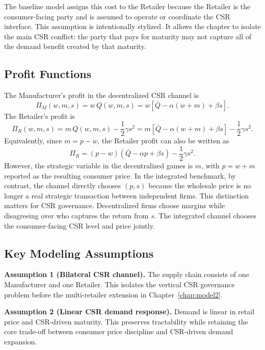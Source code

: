 The baseline model assigns this cost to the Retailer because the Retailer is the consumer-facing party and is assumed to operate or coordinate the CSR interface. This assumption is intentionally stylized. It allows the chapter to isolate the main CSR conflict: the party that pays for maturity may not capture all of the demand benefit created by that maturity.

\subsection{Profit Functions}

The Manufacturer's profit in the decentralized CSR channel is
\begin{equation}
    \Pi_M(w,m,s)=w\,Q(w,m,s)=w\left[\bar{Q}-\alpha(w+m)+\beta s\right].
    \label{eq:pi_M_markup}
\end{equation}
The Retailer's profit is
\begin{equation}
    \Pi_R(w,m,s)=m\,Q(w,m,s)-\frac{1}{2}\gamma s^2
    =m\left[\bar{Q}-\alpha(w+m)+\beta s\right]-\frac{1}{2}\gamma s^2.
    \label{eq:pi_R_markup}
\end{equation}
Equivalently, since $m=p-w$, the Retailer profit can also be written as
\begin{equation*}
    \Pi_R=(p-w)\left(\bar{Q}-\alpha p+\beta s\right)-\frac{1}{2}\gamma s^2.
\end{equation*}
However, the strategic variable in the decentralized games is $m$, with $p=w+m$ reported as the resulting consumer price. In the integrated benchmark, by contrast, the channel directly chooses $(p,s)$ because the wholesale price is no longer a real strategic transaction between independent firms. This distinction matters for CSR governance. Decentralized firms choose margins while disagreeing over who captures the return from $s$. The integrated channel chooses the consumer-facing CSR level and price jointly.

\subsection{Key Modeling Assumptions}

\textbf{Assumption 1 (Bilateral CSR channel).} The supply chain consists of one Manufacturer and one Retailer. This isolates the vertical CSR governance problem before the multi-retailer extension in Chapter~\ref{chap:model2}.

\textbf{Assumption 2 (Linear CSR demand response).} Demand is linear in retail price and CSR-driven maturity. This preserves tractability while retaining the core trade-off between consumer price discipline and CSR-driven demand expansion.

